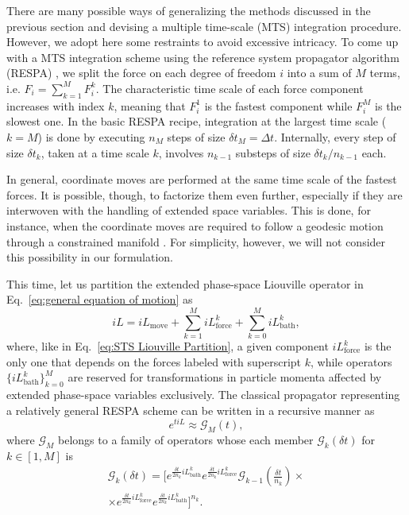 \documentclass[
    journal=jctcce,
    layout=twocolumn
]{achemso}
\newcommand{\dof}{i}   %
\newcommand{\Liu}{i\!L}
\begin{document}
There are many possible ways of generalizing the methods discussed in the previous section and devising a multiple time-scale (MTS) integration procedure.
However, we adopt here some restraints to avoid excessive intricacy.
To come up with a MTS integration scheme using the reference system propagator algorithm (RESPA) \cite{Tuckerman_1992}, we split the force on each degree of freedom $\dof$ into a sum of $M$ terms, i.e. $F_\dof = \sum_{k=1}^M F_\dof^k$.
The characteristic time scale of each force component increases with index $k$, meaning that $F_\dof^1$ is the fastest component while $F_\dof^M$ is the slowest one.
In the basic RESPA recipe, integration at the largest time scale ($k=M$) is done by executing $n_M$ steps of size $\delta t_M = \Delta t$.
Internally, every step of size $\delta t_k$, taken at a time scale $k$, involves $n_{k-1}$ substeps of size $\delta t_k/n_{k-1}$ each.

In general, coordinate moves are performed at the same time scale of the fastest forces.
It is possible, though, to factorize them even further, especially if they are interwoven with the handling of extended space variables.
This is done, for instance, when the coordinate moves are required to follow a geodesic motion through a constrained manifold \cite{Leimkuhler_2016}.
For simplicity, however, we will not consider this possibility in our formulation.

This time, let us partition the extended phase-space Liouville operator in Eq.~\eqref{eq:general equation of motion} as
\begin{equation}
\label{eq:RESPA Liouville Partition}
\Liu = \Liu_\mathrm{move} + \sum_{k=1}^M \Liu_\mathrm{force}^k + \sum_{k=0}^M \Liu_\mathrm{bath}^k,
\end{equation}
where, like in Eq.~\eqref{eq:STS Liouville Partition}, a given component $\Liu_\mathrm{force}^k$ is the only one that depends on the forces labeled with superscript $k$, while operators $\{\Liu_\mathrm{bath}^k\}_{k=0}^M$ are reserved for transformations in particle momenta affected by extended phase-space variables exclusively.
The classical propagator representing a relatively general RESPA scheme can be written in a recursive manner as
\begin{equation}
\label{eq:RESPA outermost propagator}
e^{t \Liu} \approx \mathcal{G}_M(t),
\end{equation}
where $\mathcal{G}_M$ belongs to a family of operators whose each member $\mathcal{G}_k(\delta t)$ for $k \in [1, M]$ is
\begin{multline}
\label{eq:RESPA scheme 1}
\mathcal{G}_k(\delta t) = \Big[
e^{\frac{\delta t}{2 n_k} \Liu_\mathrm{bath}^k}
e^{\frac{\delta t}{2 n_k} \Liu_\mathrm{force}^k}
\mathcal{G}_{k-1}\left(\tfrac{\delta t}{n_k}\right)
\times \\ \times
e^{\frac{\delta t}{2 n_k} \Liu_\mathrm{force}^k}
e^{\frac{\delta t}{2 n_k} \Liu_\mathrm{bath}^k}
\Big]^{n_k}.
\end{multline}
\end{document}
